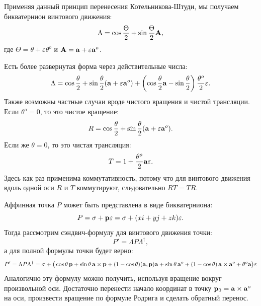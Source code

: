 Применяя данный принцип перенесения Котельникова-Штуди, мы получаем бикватернион винтового движения:
\begin{equation*}
    \Lambda = \cos\frac{\Theta}{2} + \sin\frac{\Theta}{2} \vb{A},
\end{equation*}
где $\Theta = \theta + \varepsilon \theta^o$ и $\vb{A} = \vb{a} + \varepsilon \vb{a}^o$.

Есть более развернутая форма через действительные числа:
\begin{equation*}
    \Lambda = \cos\frac{\theta}{2} + \sin\frac{\theta}{2}(\vb{a} + \varepsilon\vb{a}^o) + \left( \cos\frac{\theta}{2}\vb{a} - \sin\frac{\theta}{2} \right)\frac{\theta^o}{2}\varepsilon.
\end{equation*}
Также возможны частные случаи вроде чистого вращения и чистой трансляции. Если $\theta^o = 0$, то это чистое вращение:
\begin{equation*}
    R = \cos\frac{\theta}{2} + \sin\frac{\theta}{2}(\vb{a} + \varepsilon\vb{a}^o).
\end{equation*}
Если же $\theta = 0$, то это чистая трансляция:
\begin{equation*}
    T = 1 + \frac{\theta^o}{2}\vb{a}\varepsilon.
\end{equation*}
Здесь как раз применима коммутативность, потому что для винтового движения вдоль одной оси $R$ и $T$ коммутируют, следовательно $RT = TR$. 

Аффинная точка $P$ может быть представлена в виде бикватерниона:
\begin{equation*}
    P = \sigma + \vb{p}\varepsilon = \sigma + (x i + y j + z k)\varepsilon.
\end{equation*}
Тогда рассмотрим сэндвич-формулу для винтового движения точки:
\begin{equation*}
    P' = \Lambda P \Lambda^\dagger,
\end{equation*}
а для полной формулы точки будет верно:
\begin{equation*}
    P' = \Lambda P \Lambda^\dagger = \sigma + \big(\cos\theta\,\vb{p} + \sin\theta\,\vb{a}\times\vb{p} + (1-\cos\theta)(\vb{a},\vb{p})\vb{a} + \sin\theta\,\vb{a}^o + (1-\cos\theta)\,\vb{a}\times\vb{a}^o + \theta^o\vb{a}\big)\varepsilon
\end{equation*}
Аналогично эту формулу можно получить, используя вращение вокруг произвольной оси. Достаточно перенести начало координат в точку $\vb{p}_0 = \vb{a}\times\vb{a}^o$ на оси, произвести вращение по формуле Родрига и сделать обратный перенос.

